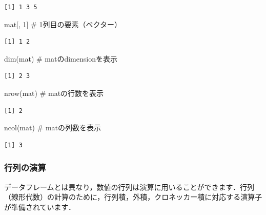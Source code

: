 \documentclass[
  letterpaper,
  DIV=11,
  numbers=noendperiod]{scrreprt}
\newenvironment{Shaded}{\begin{snugshade}}{\end{snugshade}}
\newcommand{\CommentTok}[1]{\textcolor[rgb]{0.37,0.37,0.37}{#1}}
\newcommand{\DecValTok}[1]{\textcolor[rgb]{0.68,0.00,0.00}{#1}}
\newcommand{\FunctionTok}[1]{\textcolor[rgb]{0.28,0.35,0.67}{#1}}
\newcommand{\NormalTok}[1]{\textcolor[rgb]{0.00,0.23,0.31}{#1}}
\begin{document}
\begin{verbatim}
[1] 1 3 5
\end{verbatim}

\begin{Shaded}
\begin{Highlighting}[]
\NormalTok{mat[, }\DecValTok{1}\NormalTok{] }\CommentTok{\# 1列目の要素（ベクター）}
\end{Highlighting}
\end{Shaded}

\begin{verbatim}
[1] 1 2
\end{verbatim}

\begin{Shaded}
\begin{Highlighting}[]
\FunctionTok{dim}\NormalTok{(mat) }\CommentTok{\# matのdimensionを表示}
\end{Highlighting}
\end{Shaded}

\begin{verbatim}
[1] 2 3
\end{verbatim}

\begin{Shaded}
\begin{Highlighting}[]
\FunctionTok{nrow}\NormalTok{(mat) }\CommentTok{\# matの行数を表示}
\end{Highlighting}
\end{Shaded}

\begin{verbatim}
[1] 2
\end{verbatim}

\begin{Shaded}
\begin{Highlighting}[]
\FunctionTok{ncol}\NormalTok{(mat) }\CommentTok{\# matの列数を表示}
\end{Highlighting}
\end{Shaded}

\begin{verbatim}
[1] 3
\end{verbatim}

\hypertarget{ux884cux5217ux306eux6f14ux7b97}{%
\subsubsection{行列の演算}\label{ux884cux5217ux306eux6f14ux7b97}}

データフレームとは異なり，数値の行列は演算に用いることができます．行列（線形代数）の計算のために，行列積，外積，クロネッカー積に対応する演算子が準備されています．
\end{document}
